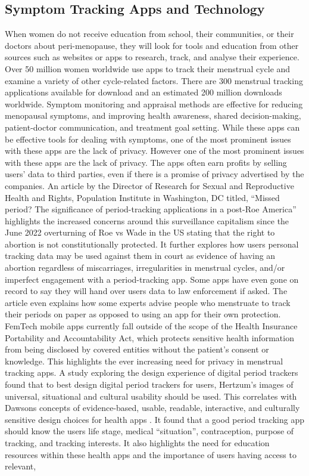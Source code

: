 \subsection{Symptom Tracking Apps and Technology}
When women do not receive education from school, their communities, or their doctors about peri-menopause, they will look for tools and education from other sources such as websites or apps to research, track, and analyse their experience. Over 50 million women worldwide use apps to track their menstrual cycle and examine a variety of other cycle-related factors\cite{Kelly2023}. There are 300 menstrual tracking applications available for download and an estimated 200 million downloads worldwide\cite{Eschler2019}. Symptom monitoring and appraisal methods are effective for reducing menopausal symptoms, and improving health awareness, shared decision-making, patient-doctor communication, and treatment goal setting\cite{Andrews2021}. While these apps can be effective tools for dealing with symptoms, one of the most prominent issues with these apps are the lack of privacy. However one of the most prominent issues with these apps are the lack of privacy. The apps often earn profits by selling users’ data to third parties, even if there is a promise of privacy advertised by the companies\cite{Gilman2021}. An article by the Director of Research for Sexual and Reproductive Health and Rights, Population Institute in Washington, DC titled, “Missed period? The significance of period-tracking applications in a post-Roe America” highlights the increased concerns around this surveillance capitalism since the June 2022 overturning of Roe vs Wade in the US stating that the right to abortion is not constitutionally protected\cite{CoenSanchez2022}. It further explores how users personal tracking data may be used against them in court as evidence of having an abortion regardless of miscarriages, irregularities in menstrual cycles, and/or imperfect engagement with a period-tracking app. Some apps have even gone on record to say they will hand over users data to law enforcement if asked. The article even explains how some experts advise people who menstruate to track their periods on paper as opposed to using an app for their own protection. FemTech mobile apps currently fall outside of the scope of the Health Insurance Portability and Accountability Act, which protects sensitive health information from being disclosed by covered entities without the patient’s consent or knowledge\cite{OCR2022}. This highlights the ever increasing need for privacy in menstrual tracking apps. A study\cite{Chan2019} exploring the design experience of digital period trackers found that to best design digital period trackers for users, Hertzum’s images of universal, situational and cultural usability should be used. This correlates with Dawsons concepts of evidence-based, usable, readable, interactive, and culturally sensitive design choices for health apps \cite{Dawson2020}. It found that a good period tracking app should know the users life stage, medical “situation”, contraception, purpose of tracking, and tracking interests. It also highlights the need for education resources within these health apps and the importance of users having access to relevant, 